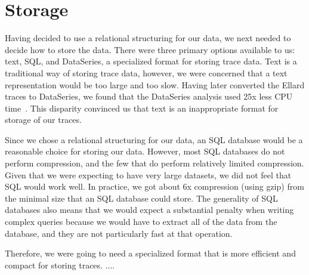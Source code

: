 \section{Storage}

Having decided to use a relational structuring for our data, we next
needed to decide how to store the data.  There were three primary
options available to us: text, SQL, and DataSeries, a specialized
format for storing trace data.  Text is a traditional way of storing
trace data, however, we were concerned that a text representation
would be too large and too slow.  Having later converted the Ellard
traces to DataSeries, we found that the DataSeries analysis used 25x
less CPU time~\cite{DSTechnicalReportSnapshot}.  This disparity
convinced us that text is an inappropriate format for storage of our
traces.

Since we chose a relational structuring for our data, an SQL database
would be a reasonable choice for storing our data.  However, most SQL
databases do not perform compression, and the few that do perform
relatively limited compression. Given that we were expecting to have
very large datasets, we did not feel that SQL would work well.  In
practice, we got about 6x compression (using gzip) from the minimal
size that an SQL database could store.  The generality of SQL
databases also means that we would expect a substantial penalty when
writing complex queries because we would have to extract all of the
data from the database, and they are not particularly fast at that
operation.

Therefore, we were going to need a specialized format that is more
efficient and compact for storing traces.  ....


